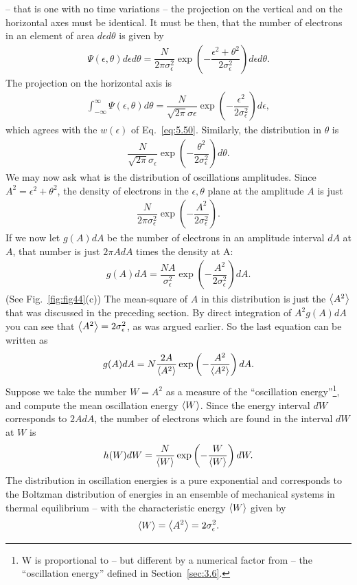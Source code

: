  -- that is one with no time variations -- the projection on the vertical and on the horizontal
 axes must be identical. It must be then, that the number of electrons in an element of area $d\epsilon d\theta$ is given by
\begin{align} \label{eq:5.57}
	\Psi(\epsilon,\theta)d\epsilon d\theta = \dfrac{N}{2\pi \sigma_\epsilon^2} \exp\left( -\dfrac{\epsilon^2 + \theta^2}{2\sigma_\epsilon^2} \right) d\epsilon d\theta.
\end{align}
The projection on the horizontal axis is
\begin{align}
	\int_{-\infty}^{\infty} \Psi(\epsilon,\theta) d\theta = \dfrac{N}{\sqrt{2\pi} \sigma\epsilon} \exp\left( -\dfrac{\epsilon^2}{2\sigma_\epsilon^2} \right) d\epsilon,
\end{align}
which agrees with the $w(\epsilon)$ of Eq.~\eqref{eq:5.50}. Similarly, the distribution in $\theta$ is
\begin{align}
	\dfrac{N}{\sqrt{2\pi} \sigma_\epsilon} \exp\left( -\dfrac{\theta^2}{2\sigma_\epsilon^2} \right) d\theta.
\end{align}
We may now ask what is the distribution of oscillations amplitudes. Since $A^2 = \epsilon^2 + \theta^2$, the density of electrons in the $\epsilon,\theta$ plane at the amplitude $A$ is just
\begin{align}
	\dfrac{N}{2\pi \sigma_\epsilon^2} \exp\left( -\dfrac{A^2}{2\sigma_\epsilon^2} \right).
\end{align}
If we now let $g(A)dA$ be the number of electrons in an amplitude interval $dA$ at $A$, that number is just $2\pi A dA$ times the density at A:
\begin{align}
	g(A) dA = \dfrac{N A}{\sigma_\epsilon^2} \exp\left( -\dfrac{A^2}{2\sigma_\epsilon^2} \right) dA.
\end{align}
(See Fig.~\ref{fig:fig44}(c)) The mean-square of $A$ in this distribution is just the $\left< A^2 \right>$ that was discussed in the preceding section. By direct integration of $A^2 g(A) dA$ you can see that $\left< A^2 \right> = 2\sigma_\epsilon^2$, as was argued earlier. So the last equation can be written as
\begin{align}
	g(A) dA = N \dfrac{2 A}{\left< A^2 \right>} \exp\left( -\dfrac{A^2}{\left< A^2 \right>} \right) dA.
\end{align}
Suppose we take the number $W = A^2$ as a measure of the ``oscillation energy''\footnote{W is proportional to -- but different by a numerical factor from -- the ``oscillation energy'' defined in Section~\ref{sec:3.6}.}, and compute the mean oscillation energy $\left< W \right>$. Since the energy interval $dW$ corresponds to $2AdA$, the number of electrons which are found in the interval
 $dW$ at $W$ is
\begin{align} \label{eq:5.62}
	h(W)dW = \dfrac{N}{\left< W \right>}\exp\left( -\dfrac{W}{\left< W \right>} \right) dW.
\end{align}
The distribution
 in oscillation energies is a pure exponential and corresponds to the Boltzman distribution of energies in an ensemble of mechanical systems in thermal equilibrium -- with the characteristic
 energy $\left< W \right>$ given by
\begin{align}
	\left< W \right> = \left< A^2 \right> = 2 \sigma_\epsilon^2.
\end{align}
